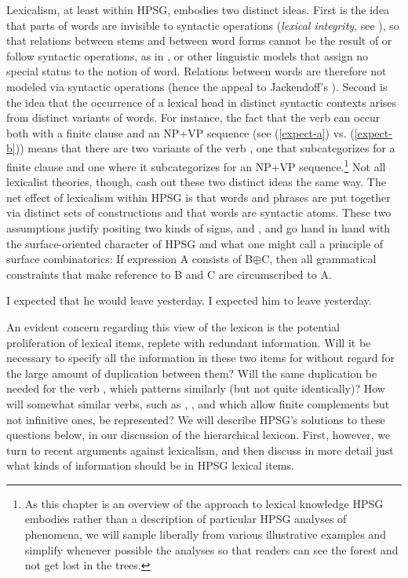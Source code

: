 \documentclass[output=paper]{langsci/langscibook}
\begin{document}
Lexicalism, at least within HPSG, embodies two distinct ideas. First is the idea that parts of words are invisible to syntactic operations (\emph{lexical integrity}, see \citealt{BresnanandMchombo1995}), so that relations between stems and between word forms cannot be the result of or follow syntactic operations, as in  \citep{HalleandMarantz1993}, or other linguistic models that assign no special status to the notion of word. Relations between words are therefore not modeled via syntactic operations (hence the appeal to Jackendoff's ). Second is the idea that the occurrence of a lexical head in distinct syntactic contexts arises from distinct variants of words. For instance, the fact that the verb  can occur both with a finite clause and an NP+VP sequence (see (\ref{expect-a}) vs. (\ref{expect-b})) means that there are two variants of the verb , one that subcategorizes for a finite clause and one where it subcategorizes for an NP+VP sequence.\footnote{As this chapter is an overview of the approach to lexical knowledge HPSG embodies rather than a description of particular HPSG analyses of phenomena, we will sample liberally from various illustrative examples and simplify whenever possible the analyses so that readers can see the forest and not get lost in the trees.} Not all lexicalist theories, though, cash out these two distinct ideas the same way. The net effect of lexicalism within HPSG is that words and phrases are put together via distinct sets of constructions and that words are syntactic atoms. These two assumptions justify positing two kinds of signs,  and , and go hand in hand with the surface-oriented character of HPSG and what one might call a principle of surface combinatorics: If expression A consists of B$\oplus$C, then all grammatical constraints that make reference to B and C are circumscribed to A. 

\begin{exe}
	\ex \label{expect-b} I expected that he would leave yesterday.
	\ex \label{expect-a} I expected him to leave yesterday.
\end{exe}

An evident concern regarding this view of the lexicon is the potential proliferation of lexical items, replete with redundant information. Will it be necessary to specify all the information in these two items for  without regard for the large amount of duplication between them? Will the same duplication be needed for the verb  , which patterns similarly (but not quite identically)? How will somewhat similar verbs, such as , , and  which allow finite complements but not infinitive ones, be represented? We will describe HPSG's solutions to these questions below, in our discussion of the hierarchical lexicon. First, however, we turn to recent arguments against lexicalism, and then discuss in more detail just what kinds of information should be in HPSG lexical items.
\end{document}
